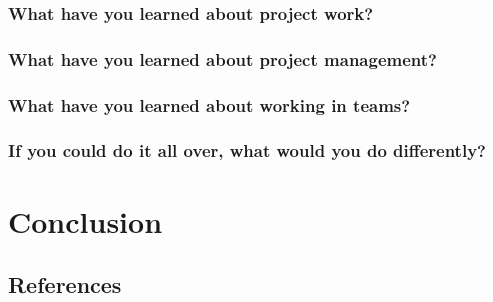 \documentclass[onecolumn, draftclsnofoot,10pt, compsoc]{IEEEtran}
\begin{document}
			\subsubsection{What have you learned about project work?}
			\subsubsection{What have you learned about project management?}
			\subsubsection{What have you learned about working in teams?}
			\subsubsection{If you could do it all over, what would you do differently?}
	\section{Conclusion}


	\subsection{References}

	\begingroup
		\renewcommand{\addcontentsline}[3]{}%
		\renewcommand{\section}[2]{}%

		
		
\end{document}
